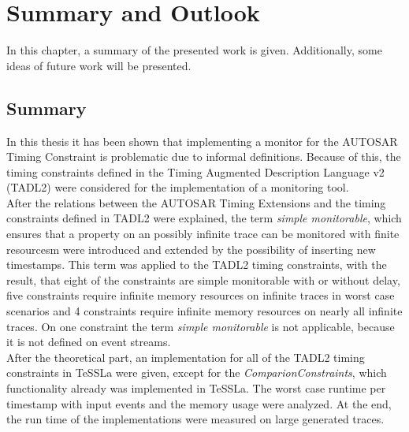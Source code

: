 
\chapter{Summary and Outlook}
\label{chapter-fazit}

In this chapter, a summary of the presented work is given. Additionally, some ideas of future work will be presented.
\section{Summary}
	In this thesis it has been shown that implementing a monitor for the AUTOSAR Timing Constraint is problematic due to informal definitions. Because of this, the timing constraints defined in the Timing Augmented Description Language v2 (TADL2) were considered for the implementation of a monitoring tool.\\
	After the relations between the AUTOSAR Timing Extensions and the timing constraints defined in TADL2 were explained, the term \textit{simple monitorable}, which ensures that a property on an possibly infinite trace can be monitored with finite resourcesm were introduced and extended by the possibility of inserting new timestamps. This term was applied to the TADL2 timing constraints, with the result, that eight of the constraints are simple monitorable with or without delay, five constraints require infinite memory resources on infinite traces in worst case scenarios and 4 constraints require infinite memory resources on nearly all infinite traces. On one constraint the term \textit{simple monitorable} is not applicable, because it is not defined on event streams.\\
	After the theoretical part, an implementation for all of the TADL2 timing constraints in TeSSLa were given, except for the \textit{ComparionConstraints}, which functionality already was implemented in TeSSLa. The worst case runtime per timestamp with input events and the memory usage were analyzed. At the end, the run time of the implementations were measured on large generated traces.
